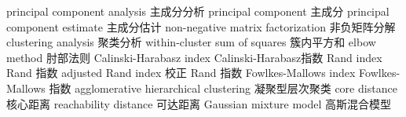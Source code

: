 {principal component analysis} 
{主成分分析}
{principal component} 
{主成分}
{principal component estimate} 
{主成分估计}
{non-negative matrix factorization} 
{非负矩阵分解}
{clustering analysis} 
{聚类分析}
{within-cluster sum of squares} 
{簇内平方和}
{elbow method} 
{肘部法则}
{Calinski-Harabasz index} 
{Calinski-Harabasz指数}
{Rand index} 
{Rand 指数}
{adjusted Rand index} 
{校正 Rand 指数}
{Fowlkes-Mallows index} 
{Fowlkes-Mallows 指数}
{agglomerative hierarchical clustering} 
{凝聚型层次聚类}
{core distance} 
{核心距离}
{reachability distance} 
{可达距离}
{Gaussian mixture model}
{高斯混合模型}
